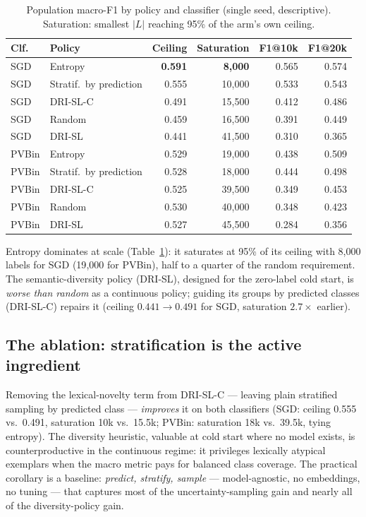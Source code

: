 \documentclass[11pt]{article}
\begin{document}
\begin{table}[htb]
\centering
\caption{Population macro-F1 by policy and classifier (single seed,
descriptive). Saturation: smallest $|L|$ reaching 95\% of the arm's own
ceiling.}
\label{tab:selectors}
\small
\begin{tabular}{llrrrr}
\toprule
\textbf{Clf.} & \textbf{Policy} & \textbf{Ceiling} & \textbf{Saturation} &
\textbf{F1@10k} & \textbf{F1@20k} \\
\midrule
SGD & Entropy      & \textbf{0.591} & \textbf{8{,}000} & 0.565 & 0.574 \\
SGD & Stratif.\ by prediction & 0.555 & 10{,}000 & 0.533 & 0.543 \\
SGD & DRI-SL-C     & 0.491 & 15{,}500 & 0.412 & 0.486 \\
SGD & Random       & 0.459 & 16{,}500 & 0.391 & 0.449 \\
SGD & DRI-SL       & 0.441 & 41{,}500 & 0.310 & 0.365 \\
\midrule
PVBin & Entropy    & 0.529 & 19{,}000 & 0.438 & 0.509 \\
PVBin & Stratif.\ by prediction & 0.528 & 18{,}000 & 0.444 & 0.498 \\
PVBin & DRI-SL-C   & 0.525 & 39{,}500 & 0.349 & 0.453 \\
PVBin & Random     & 0.530 & 40{,}000 & 0.348 & 0.423 \\
PVBin & DRI-SL     & 0.527 & 45{,}500 & 0.284 & 0.356 \\
\bottomrule
\end{tabular}
\end{table}

Entropy dominates at scale (Table~\ref{tab:selectors}): it saturates at
95\% of its ceiling with 8{,}000 labels for SGD (19{,}000 for PVBin), half
to a quarter of the random requirement. The semantic-diversity policy
(DRI-SL), designed for the zero-label cold start, is \emph{worse than
random} as a continuous policy; guiding its groups by predicted classes
(DRI-SL-C) repairs it (ceiling $0.441 \to 0.491$ for SGD, saturation
$2.7\times$ earlier).

\subsection{The ablation: stratification is the active ingredient}

Removing the lexical-novelty term from DRI-SL-C --- leaving plain
stratified sampling by predicted class --- \emph{improves} it on both
classifiers (SGD: ceiling 0.555 vs.\ 0.491, saturation 10k vs.\ 15.5k;
PVBin: saturation 18k vs.\ 39.5k, tying entropy). The diversity heuristic,
valuable at cold start where no model exists, is counterproductive in the
continuous regime: it privileges lexically atypical exemplars when the
macro metric pays for balanced class coverage. The practical corollary is
a baseline: \emph{predict, stratify, sample} --- model-agnostic, no
embeddings, no tuning --- that captures most of the uncertainty-sampling
gain and nearly all of the diversity-policy gain.
\end{document}

